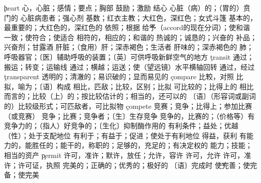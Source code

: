 \begin{multicols}{2}
\c{heart}  \n 心，心脏；感情；要点；胸部 \vt 鼓励；激励 \vi 结心
  \a 心脏（病）的；（胃的）贲门的 \n 心脏病患者；强心剂
  \n 基数；红衣主教；大红色，深红色；女式斗篷 \a 基本的，最重要的；大红色的，深红色的
  \ad 依照；根据 \v 给予（accord的现在分词）；使和谐一致；使符合；使适合 \a 相符的，相应的；和谐的
  \a 热诚的；诚恳的；兴奋的 \n 补品；兴奋剂；甘露酒
  \n 肝脏；（食用）肝；深赤褐色；生活者 \a 肝味的；深赤褐色的
  \n 肺；呼吸器官；〔医〕辅助呼吸的装置；〔英〕可供呼吸新鲜空气的地方
\c{transit}  \n 通过；搬运；转变；运输线 \vt 通过；横越；运送；使（望远镜）水平横轴回转 \vi 通过，经过
\c{transparent}  \a 透明的；清澈的；易识破的；显而易见的
\c{compare}  \v 比较，对照 \vt 比拟，喻为；〔语〕构成 \vi 相比，匹敌；比较，区别；比拟
  \a 可比较的；比得上的
  \a 相比而言的；比较（上）的；按比较估计的；相当的，还可以的 \n 〔语〕（形容词或副词的）比较级形式；可匹敌者，可比拟物
\c{compete}  \vi 竞赛；竞争；比得上；参加比赛（或竞赛）
  \n 竞争；比赛；竞争者；〔生〕生存竞争
  \a 竞争的，比赛的；（价格等）有竞争力的；（指人）好竞争的；〔生化〕抑制酶作用的 
  \n 有利条件；益处；优越（性）；处于支配地位 \vt 有利于；有益于；促进；使处于有利地位 \vi 得益，获利 
  \a 有能力的，能胜任的；能干的，称职的；足够的，充足的；有决定权的
  \n 能力；技能；相当的资产
\c{permit}  \vt 许可，准许；默许，放任；允许，容许 \vi 许可，允许  \n 许可，准许；许可证，执照
  \a 完美的；正确的；优秀的；极好的 \n 〔语〕完成时 \v 使完善；使完备；使完美


\end{multicols}
